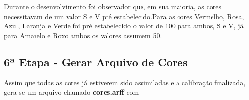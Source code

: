 Durante o desenvolvimento foi observador que, em sua maioria, as cores necessitavam de um valor S e V pré estabelecido.Para as cores Vermelho, Rosa, Azul, Laranja e Verde foi pré estabelecido o valor de 100 para ambos, S e V, já para Amarelo e Roxo ambos os valores assumem 50.

	
% 		     	
% 		     		
% 		     		
% 	        
 	        
 
  		      

	   


  \subsection{6ª Etapa - Gerar Arquivo de Cores}
  Assim que todas as cores já estiverem sido assimiladas e a calibração finalizada, gera-se um arquivo chamado \textbf{cores.arff} com 
  
  		
  
  
  

 
 
